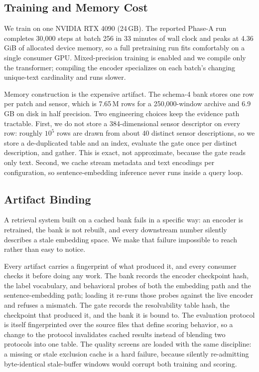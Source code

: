 \subsection{Training and Memory Cost}
\label{sec:cost}

We train on one NVIDIA RTX 4090 (24\,GB). The reported Phase-A run completes 30,000 steps at batch
256 in 33 minutes of wall clock and peaks at 4.36\,GiB of allocated device memory, so a full
pretraining run fits comfortably on a single consumer GPU. Mixed-precision training is enabled and
we compile only the transformer; compiling the encoder specializes on each batch's changing
unique-text cardinality and runs slower.

Memory construction is the expensive artifact. The schema-4 bank stores one row per patch and
sensor, which is 7.65\,M rows for a 250,000-window archive and 6.9\,GB on disk in half precision.
Two engineering choices keep the evidence path tractable. First, we do not store a 384-dimensional
sensor descriptor on every row: roughly $10^5$ rows are drawn from about 40 distinct sensor
descriptions, so we store a de-duplicated table and an index, evaluate the gate once per distinct
description, and gather. This is exact, not approximate, because the gate reads only text. Second,
we cache stream metadata and text encodings per configuration, so sentence-embedding inference never
runs inside a query loop.

\subsection{Artifact Binding}
\label{sec:guards}

A retrieval system built on a cached bank fails in a specific way: an encoder is retrained, the bank
is not rebuilt, and every downstream number silently describes a stale embedding space. We make that
failure impossible to reach rather than easy to notice.

Every artifact carries a fingerprint of what produced it, and every consumer checks it before doing
any work. The bank records the encoder checkpoint hash, the label vocabulary, and behavioral probes
of both the embedding path and the sentence-embedding path; loading it re-runs those probes against
the live encoder and refuses a mismatch. The gate records the resolvability table hash, the
checkpoint that produced it, and the bank it is bound to. The evaluation protocol is itself
fingerprinted over the source files that define scoring behavior, so a change to the protocol
invalidates cached results instead of blending two protocols into one table. The quality screens are
loaded with the same discipline: a missing or stale exclusion cache is a hard failure, because
silently re-admitting byte-identical stale-buffer windows would corrupt both training and scoring.

